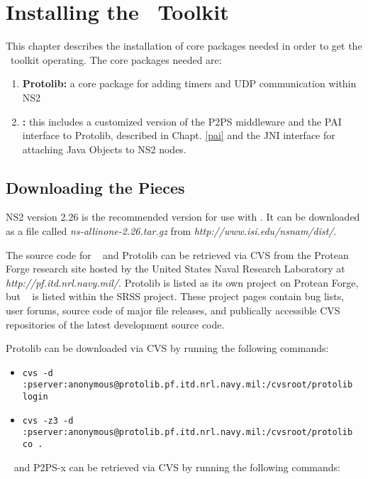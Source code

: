 \chapter{Installing the \agentj~Toolkit}
\label{install}

This chapter describes the installation of core packages needed in
order to get the \agentj~toolkit operating. The core packages needed
are:


\begin{enumerate}
\item \textbf{Protolib:} a core package for adding timers and UDP
communication within NS2 \cite{protolib}
\item \textbf{\agentj:} this includes a customized version of the 
P2PS middleware \cite{p2ps} and the PAI interface to Protolib,
described in Chapt. \ref{pai} and the JNI interface for attaching  
Java Objects to NS2 nodes.
\end{enumerate}

\section{Downloading the Pieces} 

NS2 version 2.26 is the recommended version for use with \agentj.  It can be
downloaded as a file called \emph{ns-allinone-2.26.tar.gz} from
\emph{http://www.isi.edu/nsnam/dist/}.

The source code for \agentj~ and Protolib can be retrieved via CVS from the
Protean Forge research site hosted by the United States Naval Research
Laboratory at \emph{http://pf.itd.nrl.navy.mil/}.  Protolib is listed as its
own project on Protean Forge, but \agentj~ is listed within the SRSS project. 
These project pages contain bug lists, user forums, source code of major file
releases, and publically accessible CVS repositories of the latest development
source code. 

Protolib can be downloaded via CVS by running the following commands:

\begin{itemize}
\item{{\tt cvs -d :pserver:anonymous@protolib.pf.itd.nrl.navy.mil:/cvsroot/protolib login}}
\item{{\tt cvs -z3 -d :pserver:anonymous@protolib.pf.itd.nrl.navy.mil:/cvsroot/protolib co .}}
\end{itemize}

\agentj~ and P2PS-x can be retrieved via CVS by running the following commands:

